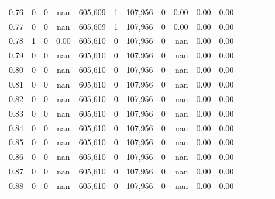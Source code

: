 \begin{tabular}{rrrcrrrrrrrrrrr}
0.76 &       0 &      0 &                                        nan &  605,609 &        1 &  107,956 &        0 &  0.00 &  0.00 &                         0.00 \\
0.77 &       0 &      0 &                                        nan &  605,609 &        1 &  107,956 &        0 &  0.00 &  0.00 &                         0.00 \\
0.78 &       1 &      0 &                                       0.00 &  605,610 &        0 &  107,956 &        0 &   nan &  0.00 &                         0.00 \\
0.79 &       0 &      0 &                                        nan &  605,610 &        0 &  107,956 &        0 &   nan &  0.00 &                         0.00 \\
0.80 &       0 &      0 &                                        nan &  605,610 &        0 &  107,956 &        0 &   nan &  0.00 &                         0.00 \\
0.81 &       0 &      0 &                                        nan &  605,610 &        0 &  107,956 &        0 &   nan &  0.00 &                         0.00 \\
0.82 &       0 &      0 &                                        nan &  605,610 &        0 &  107,956 &        0 &   nan &  0.00 &                         0.00 \\
0.83 &       0 &      0 &                                        nan &  605,610 &        0 &  107,956 &        0 &   nan &  0.00 &                         0.00 \\
0.84 &       0 &      0 &                                        nan &  605,610 &        0 &  107,956 &        0 &   nan &  0.00 &                         0.00 \\
0.85 &       0 &      0 &                                        nan &  605,610 &        0 &  107,956 &        0 &   nan &  0.00 &                         0.00 \\
0.86 &       0 &      0 &                                        nan &  605,610 &        0 &  107,956 &        0 &   nan &  0.00 &                         0.00 \\
0.87 &       0 &      0 &                                        nan &  605,610 &        0 &  107,956 &        0 &   nan &  0.00 &                         0.00 \\
0.88 &       0 &      0 &                                        nan &  605,610 &        0 &  107,956 &        0 &   nan &  0.00 &                         0.00 \\

\end{tabular}
